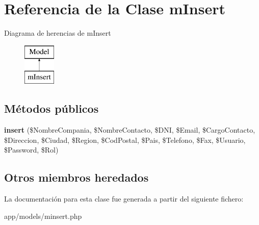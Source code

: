 \hypertarget{classm_insert}{}\section{Referencia de la Clase m\+Insert}
\label{classm_insert}
Diagrama de herencias de m\+Insert\begin{figure}[H]
\begin{center}
\leavevmode
\includegraphics[height=2.000000cm]{classm_insert}
\end{center}
\end{figure}
\subsection*{Métodos públicos}
\begin{DoxyCompactItemize}
\item 
\hypertarget{classm_insert_a4294ecf2164cd0e0b13a7ec635f3cdd7}{}{\bfseries insert} (\$Nombre\+Compania, \$Nombre\+Contacto, \$D\+N\+I, \$Email, \$Cargo\+Contacto, \$Direccion, \$Ciudad, \$Region, \$Cod\+Postal, \$Pais, \$Telefono, \$Fax, \$Usuario, \$Password, \$Rol)\label{classm_insert_a4294ecf2164cd0e0b13a7ec635f3cdd7}

\end{DoxyCompactItemize}
\subsection*{Otros miembros heredados}


La documentación para esta clase fue generada a partir del siguiente fichero\+:\begin{DoxyCompactItemize}
\item 
app/models/minsert.\+php\end{DoxyCompactItemize}
